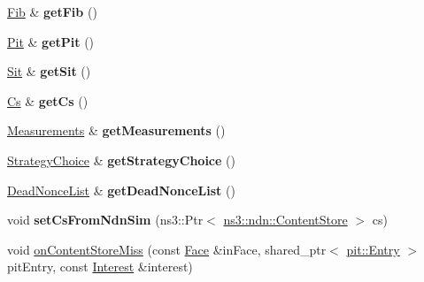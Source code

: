 \begin{DoxyCompactItemize}
\item 
\hyperlink{classnfd_1_1Fib}{Fib} \& {\bfseries get\+Fib} ()\hypertarget{classnfd_1_1Forwarder_a5efd26071e55bc032ed7ee2fa0865bed}{}\label{classnfd_1_1Forwarder_a5efd26071e55bc032ed7ee2fa0865bed}

\item 
\hyperlink{classnfd_1_1Pit}{Pit} \& {\bfseries get\+Pit} ()\hypertarget{classnfd_1_1Forwarder_a8a0b6e29076d6386b36139f3abcda5b0}{}\label{classnfd_1_1Forwarder_a8a0b6e29076d6386b36139f3abcda5b0}

\item 
\hyperlink{classnfd_1_1Sit}{Sit} \& {\bfseries get\+Sit} ()\hypertarget{classnfd_1_1Forwarder_a1015b8521ddcbdc19cef917f39d9c776}{}\label{classnfd_1_1Forwarder_a1015b8521ddcbdc19cef917f39d9c776}

\item 
\hyperlink{classnfd_1_1cs_1_1Cs}{Cs} \& {\bfseries get\+Cs} ()\hypertarget{classnfd_1_1Forwarder_af3efa78a61a610927b6b28f0fd817bd3}{}\label{classnfd_1_1Forwarder_af3efa78a61a610927b6b28f0fd817bd3}

\item 
\hyperlink{classnfd_1_1Measurements}{Measurements} \& {\bfseries get\+Measurements} ()\hypertarget{classnfd_1_1Forwarder_ab4be51b18d1b702eccdbfdeb188ce4ba}{}\label{classnfd_1_1Forwarder_ab4be51b18d1b702eccdbfdeb188ce4ba}

\item 
\hyperlink{classnfd_1_1StrategyChoice}{Strategy\+Choice} \& {\bfseries get\+Strategy\+Choice} ()\hypertarget{classnfd_1_1Forwarder_ab36bf2b0c2a31caabdb4e16d8ad69239}{}\label{classnfd_1_1Forwarder_ab36bf2b0c2a31caabdb4e16d8ad69239}

\item 
\hyperlink{classnfd_1_1DeadNonceList}{Dead\+Nonce\+List} \& {\bfseries get\+Dead\+Nonce\+List} ()\hypertarget{classnfd_1_1Forwarder_ab9ca95ae8a5cb6eba83752a65153415c}{}\label{classnfd_1_1Forwarder_ab9ca95ae8a5cb6eba83752a65153415c}

\item 
void {\bfseries set\+Cs\+From\+Ndn\+Sim} (ns3\+::\+Ptr$<$ \hyperlink{classns3_1_1ndn_1_1ContentStore}{ns3\+::ndn\+::\+Content\+Store} $>$ cs)\hypertarget{classnfd_1_1Forwarder_af3822ea4b71b42f391d046e3991c087d}{}\label{classnfd_1_1Forwarder_af3822ea4b71b42f391d046e3991c087d}

\item 
void \hyperlink{classnfd_1_1Forwarder_a7a7feac7008f35109aeb70fbcfaac80c}{on\+Content\+Store\+Miss} (const \hyperlink{classnfd_1_1Face}{Face} \&in\+Face, shared\+\_\+ptr$<$ \hyperlink{classnfd_1_1pit_1_1Entry}{pit\+::\+Entry} $>$ pit\+Entry, const \hyperlink{classndn_1_1Interest}{Interest} \&interest)\hypertarget{classnfd_1_1Forwarder_a7a7feac7008f35109aeb70fbcfaac80c}{}\label{classnfd_1_1Forwarder_a7a7feac7008f35109aeb70fbcfaac80c}


\end{DoxyCompactItemize}
